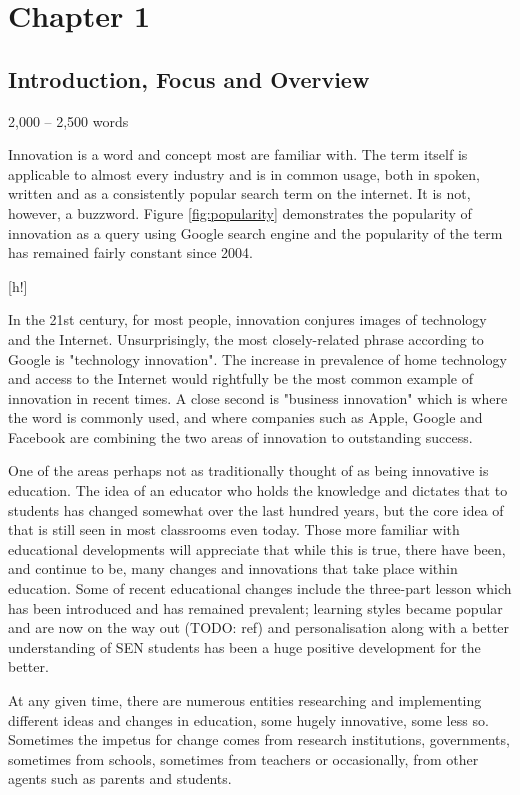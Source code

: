 \section{Chapter 1}
\subsection{Introduction, Focus and Overview}
2,000 – 2,500 words\citep{Frame61:online}

Innovation is a word and concept most are familiar with. The term itself is applicable to almost every industry and is in common usage, both in spoken, written and as a consistently popular search term on the internet. \cite{CorpusofContemporaryAmericanEnglish,Google} It is not, however, a buzzword. Figure \ref{fig:popularity} demonstrates the popularity of innovation as a query using Google search engine and the popularity of the term has remained fairly constant since 2004.

[h!]

In the 21st century, for most people, innovation conjures images of technology and the Internet. Unsurprisingly, the most closely-related phrase according to Google is "technology innovation". \cite{Google} The increase in prevalence of home technology and access to the Internet would rightfully be the most common example of innovation in recent times. A close second is "business innovation" which is where the word is commonly used, and where companies such as Apple, Google and Facebook are combining the two areas of innovation to outstanding success.

One of the areas perhaps not as traditionally thought of as being innovative is education. The idea of an educator who holds the knowledge and dictates that to students has changed somewhat over the last hundred years, but the core idea of that is still seen in most classrooms even today. Those more familiar with educational developments will appreciate that while this is true, there have been, and continue to be, many changes and innovations that take place within education. Some of recent educational changes include the three-part lesson which has been introduced and has remained prevalent; learning styles became popular and are now on the way out (TODO: ref) and personalisation along with a better understanding of SEN students has been a huge positive development for the better.

At any given time, there are numerous entities researching and implementing different ideas and changes in education, some hugely innovative, some less so. Sometimes the impetus for change comes from research institutions, governments, sometimes from schools, sometimes from teachers or occasionally, from other agents such as parents and students. 

